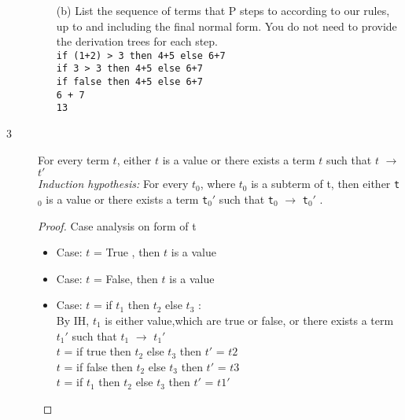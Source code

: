 \documentclass{article}
\begin{document}
\begin{description}
\begin{enumerate}
                \item[(b)]{List the sequence of terms that P steps to according to our rules, up to and including the final normal form.
                You do not need to provide the derivation trees for each step.
                }
                    \\
                    \verb|if (1+2) > 3 then 4+5 else 6+7| \\
                    \verb|if 3 > 3 then 4+5 else 6+7| \\
                    \verb|if false then 4+5 else 6+7| \\
                    \verb|6 + 7| \\
                    \verb|13| \\
            \end{enumerate}
        \item[3] {For every term $t$, either $t$ is a value or there exists a term $t$ such that $t$ $\rightarrow$ $t'$}\\
                \textit{Induction hypothesis:} For every $t_0$, where $t_0$ is a subterm of t, then  either \verb|t|$_0$ is a value or there exists a term \verb|t|$_0'$  such that \verb|t|$_0$  $\rightarrow$ \verb|t|$_0'$ .
                \begin{proof}
                    Case analysis on form of t
                    \begin{itemize}
                        \item Case: $t$ = True , then $t$ is a value
                        \item Case: $t$ = False, then $t$ is a value
                        \item Case: $t$ = if $t_1$ then $t_2$ else $t_3$ :\\
                                By IH, $t_1$ is either value,which are true or false, or there exists a term $t_1'$  such that $t_1$  $\rightarrow$ $t_1'$ \\
                                $t$ = if true then $t_2$ else $t_3$ then $t'$ = $t2$ \\
                                $t$ = if false then $t_2$ else $t_3$ then $t'$ = $t3$ \\
                                $t$ = if $t_1$ then $t_2$ else $t_3$ then $t'$ = $t1'$ \\


\end{itemize}
\end{proof}
\end{description}
\end{document}
